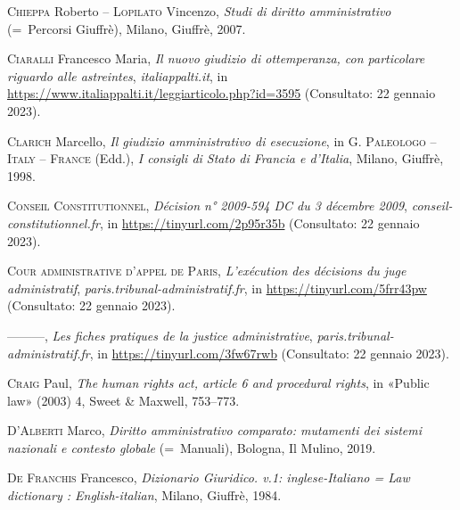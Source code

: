 \documentclass[12pt,it,a4paper,]{report}
\newlength{\cslhangindent}
\newenvironment{CSLReferences}[2] %
 {%
  \setlength{\parindent}{0pt}
  \ifodd #1 \everypar{\setlength{\hangindent}{\cslhangindent}}\ignorespaces\fi
  \ifnum #2 > 0
  \setlength{\parskip}{#2\baselineskip}
  \fi
 }%
 {}
\begin{document}
\begin{CSLReferences}{1}{0}
\leavevmode{}%
\textsc{Chieppa} Roberto -- \textsc{Lopilato} Vincenzo, \emph{Studi di
diritto amministrativo} (=~Percorsi Giuffrè), Milano, Giuffrè, 2007.

\leavevmode{}%
\textsc{Ciaralli} Francesco Maria, \emph{Il nuovo giudizio di
ottemperanza, con particolare riguardo alle astreintes},
\emph{italiappalti.it}, in
\url{https://www.italiappalti.it/leggiarticolo.php?id=3595} (Consultato:
22 gennaio 2023).

\leavevmode{}%
\textsc{Clarich} Marcello, \emph{Il giudizio amministrativo di
esecuzione}, in G. \textsc{Paleologo} -- \textsc{Italy} --
\textsc{France} (Edd.), \emph{I consigli di Stato di Francia e
d'Italia}, Milano, Giuffrè, 1998.

\leavevmode{}%
\textsc{Conseil Constitutionnel}, \emph{Décision n° 2009-594 DC du 3
décembre 2009}, \emph{conseil-constitutionnel.fr}, in
\url{https://tinyurl.com/2p95r35b} (Consultato: 22 gennaio 2023).

\leavevmode{}%
\textsc{Cour administrative d'appel de Paris}, \emph{L'exécution des
décisions du juge administratif},
\emph{paris.tribunal-administratif.fr}, in
\url{https://tinyurl.com/5frr43pw} (Consultato: 22 gennaio 2023).

\leavevmode{}%
---------, \emph{Les fiches pratiques de la justice administrative},
\emph{paris.tribunal-administratif.fr}, in
\url{https://tinyurl.com/3fw67rwb} (Consultato: 22 gennaio 2023).

\leavevmode{}%
\textsc{Craig} Paul, \emph{The human rights act, article 6 and
procedural rights}, in {«Public law»} (2003) 4, Sweet \& Maxwell,
753--773.

\leavevmode{}%
\textsc{D'Alberti} Marco, \emph{Diritto amministrativo comparato:
mutamenti dei sistemi nazionali e contesto globale} (=~Manuali),
Bologna, Il Mulino, 2019.

\leavevmode{}%
\textsc{De Franchis} Francesco, \emph{Dizionario Giuridico. v.1:
inglese-Italiano = Law dictionary : English-italian}, Milano, Giuffrè,
1984.


\end{CSLReferences}
\end{document}
